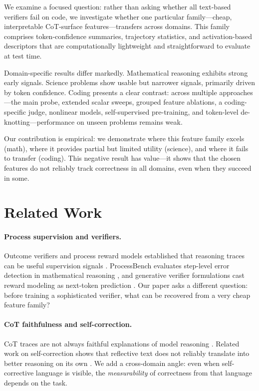 \documentclass[10pt,twocolumn]{article}
\begin{document}
We examine a focused question: rather than asking whether all text-based verifiers fail on code, we investigate whether one particular family---cheap, interpretable CoT-surface features---transfers across domains. This family comprises token-confidence summaries, trajectory statistics, and activation-based descriptors that are computationally lightweight and straightforward to evaluate at test time.

Domain-specific results differ markedly. Mathematical reasoning exhibits strong early signals. Science problems show usable but narrower signals, primarily driven by token confidence. Coding presents a clear contrast: across multiple approaches---the main probe, extended scalar sweeps, grouped feature ablations, a coding-specific judge, nonlinear models, self-supervised pre-training, and token-level de-knotting---performance on unseen problems remains weak.

Our contribution is empirical: we demonstrate where this feature family excels (math), where it provides partial but limited utility (science), and where it fails to transfer (coding). This negative result has value---it shows that the chosen features do not reliably track correctness in all domains, even when they succeed in some.

\section{Related Work}

\paragraph{Process supervision and verifiers.}
Outcome verifiers and process reward models established that reasoning traces can be useful supervision signals \citep{cobbe2021training,lightman2023verify,wang2024mathshepherd}. ProcessBench evaluates step-level error detection in mathematical reasoning \citep{zheng2025processbench}, and generative verifier formulations cast reward modeling as next-token prediction \citep{zhang2025genrm}. Our paper asks a different question: before training a sophisticated verifier, what can be recovered from a very cheap feature family?

\paragraph{CoT faithfulness and self-correction.}
CoT traces are not always faithful explanations of model reasoning \citep{lanham2023faithfulness}. Related work on self-correction shows that reflective text does not reliably translate into better reasoning on its own \citep{huang2024selfcorrect,liu2024intrinsic,madaan2023selfrefine,shinn2023reflexion}. We add a cross-domain angle: even when self-corrective language is visible, the \emph{measurability} of correctness from that language depends on the task.
\end{document}
